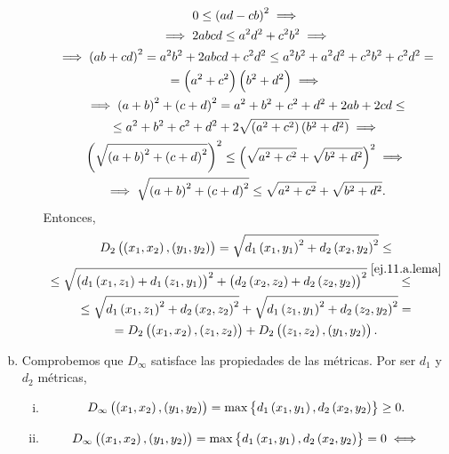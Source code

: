\begin{ej}
\begin{enumerate}[(a)]
\begin{enumerate}[i)]
\begin{gather}
                0 \leq \left( ad -cb \right) ^2 \implies \\ \nonumber
                \implies 2abcd \leq a^2d^2+c^2b^2 \implies \\  \nonumber
                \implies \left( ab+cd \right) ^2 = a^2b^2 + 2abcd + c^2d^2 \leq a^2b^2+a^2d^2+c^2b^2+c^2d^2 = \\ \nonumber
                = \left( a^2+c^2 \right) \left( b^2+d^2 \right) \implies \\ \nonumber
                \implies \left( a+b \right) ^2 + \left( c+d\right) ^2 = a^2+b^2+c^2+d^2 +2ab +2cd \leq \\ \nonumber
                \leq a^2+b^2+c^2+d^2+2\sqrt{\left( a^2+c^2\right) \left( b^2+d^2\right)} \implies \\ \nonumber
                \left( \sqrt{\left( a+b \right) ^2 + \left( c+d \right) ^2} \right) ^2 \leq \left( \sqrt{a^2+c^2} + \sqrt{b^2+d^2} \right) ^2 \implies \\ 
                \implies \sqrt{\left( a+b \right) ^2 + \left( c+d \right) ^2} \leq \sqrt{a^2+c^2} + \sqrt{b^2+d^2}.
            \end{gather}
            Entonces,
            \begin{gather*}
                D_2 \left( \left( x_1, x_2 \right) , \left( y_1 , y_2 \right) \right) = \sqrt{ d_1 \left( x_1, y_1\right) ^2 + d_2 \left( x_2 , y_2 \right)^2 } \leq \\
                \leq \sqrt{ \left( d_1 \left( x_1, z_1\right) + d_1\left( z_1, y_1 \right) \right) ^2 + \left( d_2 \left( x_2, z_2 \right) + d_2\left( z_2, y_2 \right) \right) ^2 } \stackrel{\ref{ej.11.a.lema}}{\leq} \\
                \leq \sqrt{d_1\left( x_1, z_1 \right) ^2+d_2 \left( x_2, z_2 \right) ^2} + \sqrt{d_1\left( z_1, y_1 \right) ^2+d_2 \left( z_2, y_2 \right) ^2} = \\
                = D_2 \left( \left( x_1, x_2 \right) , \left( z_1 , z_2 \right) \right) + D_2 \left( \left( z_1, z_2 \right) , \left( y_1 , y_2 \right) \right).
            \end{gather*}            
		\end{enumerate}
		\item Comprobemos que $D_{\infty}$ satisface las propiedades de las métricas. Por ser $d_1$ y $d_2$ métricas,
		\begin{enumerate}[i)]
            \item
            \[
                D_{\infty} \left( \left( x_1, x_2 \right) , \left( y_1 , y_2 \right) \right) = \max \left\{ d_1 \left( x_1, y_1\right) , d_2 \left( x_2 , y_2 \right) \right\} \geq 0.
            \]
            \item 
            \begin{gather*}
                D_{\infty} \lp \lp x_1, x_2 \rp , \lp y_1 , y_2 \rp \rp = \max \left\{ d_1 \lp x_1, y_1\rp , d_2 \lp x_2 , y_2 \rp \right\} = 0  \iff \\

\end{gather*}
\end{enumerate}
\end{enumerate}
\end{ej}
